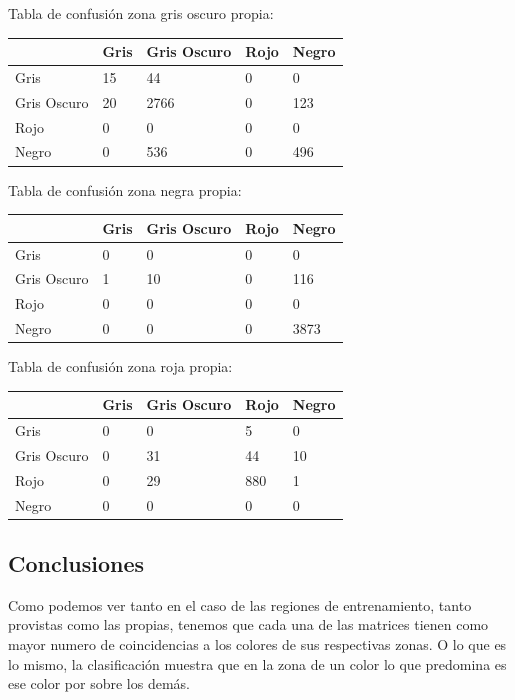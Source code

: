 \documentclass[a4paper,10pt]{article}
\begin{document}
Tabla de confusión zona gris oscuro propia:\newline
\begin{tabular}{| l | l | l | l | l |  }
		& Gris &   Gris Oscuro     & Rojo    & Negro\\ \hline
Gris		&15   &       44  &  0   &    0\\ \hline
Gris Oscuro		&20  &      2766   & 0  &   123\\ \hline
Rojo		&0   &   0   &  0  & 0\\ \hline
Negro		&0  &       536     &0 &   496\\ \hline
\end{tabular}\newline

Tabla de confusión zona negra propia:\newline
\begin{tabular}{| l | l | l | l | l | }
		& Gris &   Gris Oscuro     & Rojo    & Negro\\ \hline
Gris         &  0    &       0  & 0 &         0\\ \hline
Gris Oscuro &          1      &    10    & 0  &     116\\ \hline
Rojo  &  0  &  0 & 0  & 0\\ \hline
Negro   &        0         &  0    &0 &    3873\\ \hline
\end{tabular}\newline

Tabla de confusión zona roja propia:\newline
\begin{tabular}{| l | l | l | l | l | }
		& Gris &   Gris Oscuro     & Rojo    & Negro\\ \hline
Gris     &0    & 0&     5    & 0\\ \hline
Gris Oscuro     &0   & 31 &   44   & 10\\ \hline
Rojo     &0  &  29  & 880  &   1\\ \hline
Negro     &0 &    0   &  0 &    0\\ \hline
\end{tabular} 

\subsection{Conclusiones}

Como podemos ver tanto en el caso de las regiones de entrenamiento, tanto provistas como las propias, tenemos que cada una de las matrices tienen como mayor numero de coincidencias a los colores de sus respectivas zonas. O lo que es lo mismo, la clasificaci\'on muestra que en la zona de un color lo que predomina es ese color por sobre los dem\'as.
\end{document}
